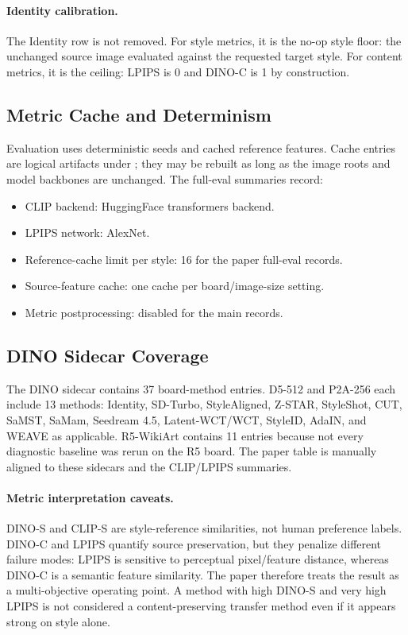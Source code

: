 \documentclass[10pt,twocolumn]{article}
\newcommand{\weave}{WEAVE}
\newcommand{\dinos}{DINO-S}
\newcommand{\dinoc}{DINO-C}
\newcommand{\clips}{CLIP-S}
\begin{document}
\paragraph{Identity calibration.}
The Identity row is not removed. For style metrics, it is the no-op style floor: the
unchanged source image evaluated against the requested target style. For content metrics,
it is the ceiling: LPIPS is 0 and \dinoc{} is 1 by construction.

\subsection{Metric Cache and Determinism}

Evaluation uses deterministic seeds and cached reference features. Cache entries are
logical artifacts under ; they may be rebuilt as long as
the image roots and model backbones are unchanged. The full-eval summaries record:
\begin{itemize}[leftmargin=1.5em,itemsep=0.2em]
  \item CLIP backend: HuggingFace transformers backend.
  \item LPIPS network: AlexNet.
  \item Reference-cache limit per style: 16 for the paper full-eval records.
  \item Source-feature cache: one cache per board/image-size setting.
  \item Metric postprocessing: disabled for the main records.
\end{itemize}

\subsection{DINO Sidecar Coverage}

The DINO sidecar contains 37 board-method entries. D5-512 and P2A-256 each include 13
methods: Identity, SD-Turbo, StyleAligned, Z-STAR, StyleShot, CUT, SaMST, SaMam,
Seedream 4.5, Latent-WCT/WCT, StyleID, AdaIN, and \weave{} as applicable. R5-WikiArt
contains 11 entries because not every diagnostic baseline was rerun on the R5 board.
The paper table is manually aligned to these sidecars and the CLIP/LPIPS summaries.

\paragraph{Metric interpretation caveats.}
\dinos{} and \clips{} are style-reference similarities, not human preference labels.
\dinoc{} and LPIPS quantify source preservation, but they penalize different failure
modes: LPIPS is sensitive to perceptual pixel/feature distance, whereas \dinoc{} is a
semantic feature similarity. The paper therefore treats the result as a multi-objective
operating point. A method with high \dinos{} and very high LPIPS is not considered a
content-preserving transfer method even if it appears strong on style alone.
\end{document}
